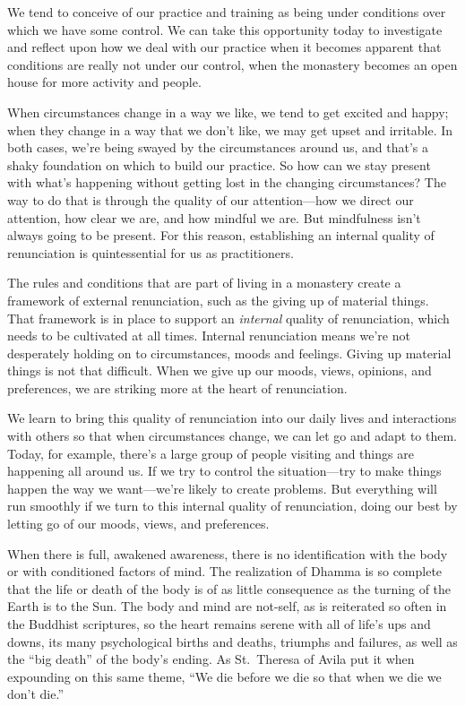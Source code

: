 We tend to conceive of our practice and training as being under 
conditions over which we have some control. We can take this 
opportunity today to investigate and reflect upon how we deal with our 
practice when it becomes apparent that conditions are really not under 
our control, when the monastery becomes an open house for more activity 
and people.

When circumstances change in a way we like, we tend to get excited and 
happy; when they change in a way that we don't like, we may get upset 
and irritable. In both cases, we're being swayed by the circumstances 
around us, and that's a shaky foundation on which to build our 
practice. So how can we stay present with what's happening without 
getting lost in the changing circumstances? The way to do that is 
through the quality of our attention---how we direct our attention, how 
clear we are, and how mindful we are. But mindfulness isn't always 
going to be present. For this reason, establishing an internal quality 
of renunciation is quintessential for us as practitioners.

The rules and conditions that are part of living in a monastery create 
a framework of external renunciation, such as the giving up of material 
things. That framework is in place to support an \emph{internal} 
quality of renunciation, which needs to be cultivated at all times. 
Internal renunciation means we're not desperately holding on to 
circumstances, moods and feelings. Giving up material things is not 
that difficult. When we give up our moods, views, opinions, and 
preferences, we are striking more at the heart of renunciation.

We learn to bring this quality of renunciation into our daily lives and 
interactions with others so that when circumstances change, we can let 
go and adapt to them. Today, for example, there's a large group of 
people visiting and things are happening all around us. If we try to 
control the situation---try to make things happen the way we 
want---we're likely to create problems. But everything will run 
smoothly if we turn to this internal quality of renunciation, doing our 
best by letting go of our moods, views, and preferences.


When there is full, awakened awareness, there is no identification with 
the body or with conditioned factors of mind. The realization of Dhamma 
is so complete that the life or death of the body is of as little 
consequence as the turning of the Earth is to the Sun. The body and 
mind are not-self, as is reiterated so often in the Buddhist 
scriptures, so the heart remains serene with all of life's ups and 
downs, its many psychological births and deaths, triumphs and failures, 
as well as the ``big death'' of the body's ending. As St. Theresa of 
Avila put it when expounding on this same theme, ``We die before we die 
so that when we die we don't die.''

